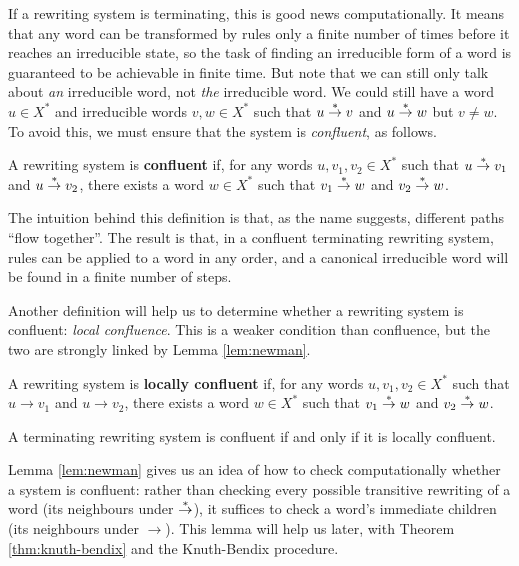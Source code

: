 If a rewriting system is terminating, this is good news computationally.  It
means that any word can be transformed by rules only a finite number of times
before it reaches an irreducible state, so the task of finding an irreducible
form of a word is guaranteed to be achievable in finite time.  But note that we
can still only talk about \textit{an} irreducible word, not \textit{the}
irreducible word.  We could still have a word $u \in X^*$ and irreducible words
$v, w \in X^*$ such that $u \stackrel{*}{\to} v$ and $u \stackrel{*}{\to} w$ but $v \neq w$.
To avoid this, we must ensure that the system is \textit{confluent}, as follows.

\begin{definition}
  A rewriting system is \textbf{confluent} if, for any words $u,v_1,v_2 \in X^*$
  such that $u \stackrel{*}{\to} v_1$ and $u \stackrel{*}{\to} v_2$, there exists a word $w \in X^*$
  such that $v_1 \stackrel{*}{\to} w$ and $v_2 \stackrel{*}{\to} w$.
\end{definition}

The intuition behind this definition is that, as the name suggests, different
paths ``flow together''.  The result is that, in a confluent terminating
rewriting system, rules can be applied to a word in any order, and a canonical
irreducible word will be found in a finite number of steps.

Another definition will help us to determine whether a rewriting system is
confluent: \textit{local confluence}.  This is a weaker condition than
confluence, but the two are strongly linked by Lemma \ref{lem:newman}.


\begin{definition}
  A rewriting system is \textbf{locally confluent} if, for any words
  $u,v_1,v_2 \in X^*$ such that $u \to v_1$ and $u \to v_2$, there exists a word
  $w \in X^*$ such that $v_1 \stackrel{*}{\to} w$ and $v_2 \stackrel{*}{\to} w$.
\end{definition}

\begin{lemma} %
  \label{lem:newman}
  A terminating rewriting system is confluent if and only if it is locally
  confluent.
\end{lemma}

Lemma \ref{lem:newman} gives us an idea of how to check computationally whether
a system is confluent: rather than checking every possible transitive rewriting
of a word (its neighbours under $\stackrel{*}{\to}$), it suffices to check a word's
immediate children (its neighbours under $\to$).  This lemma will help us later,
with Theorem \ref{thm:knuth-bendix} and the Knuth-Bendix procedure.

